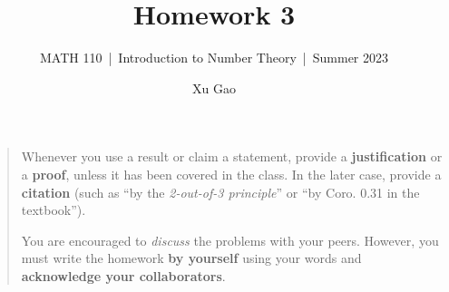 \documentclass[11pt]{article}
\title{Homework 3}
\author{Xu Gao}
\subtitle{MATH 110~|~Introduction to Number Theory~|~Summer 2023}
\date{}
\theoremstyle{plain}
\theoremstyle{definition}
\theoremstyle{remark}
\numberwithin{equation}{problem}
\begin{document}
\maketitle

\begin{quotation}
	Whenever you use a result or claim a statement, provide a \textbf{justification} or a \textbf{proof}, unless it has been covered in the class. In the later case, provide a \textbf{citation} (such as ``by the \emph{2-out-of-3 principle}'' or ``by Coro. 0.31 in the textbook'').

	You are encouraged to \emph{discuss} the problems with your peers. However, you must write the homework \textbf{by yourself} using your words and \textbf{acknowledge your collaborators}.
\end{quotation}
\end{document}
